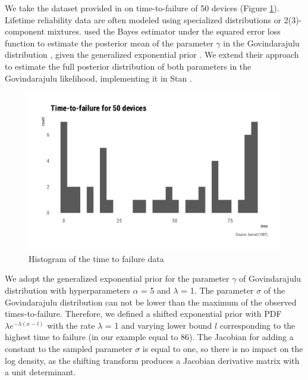 \documentclass[ba]{imsart}
\numberwithin{equation}{section}
\theoremstyle{plain}
\begin{document}
We take the dataset provided in \citet{aarset1987HowIdentifyBathtub} on time-to-failure of 50 devices (Figure \ref{fig:bathtub-hist}). Lifetime reliability data are often modeled using specialized distributions \citep{nadarajah2009BathtubshapedFailureRate} or 2(3)-component mixtures. \citet{nair2020BayesianInferenceQuantile} used the Bayes estimator under the squared error loss function to estimate the posterior mean of the parameter \(\gamma\) in the Govindarajulu distribution \citep{nair2012GovindarajuluDistributionProperties}, given the generalized exponential prior \citep{gupta2007GeneralizedExponentialDistribution}. We extend their approach to estimate the full posterior distribution of both parameters in the Govindarajulu likelihood, implementing it in Stan \citep{standevelopmentteam2021RStanInterfaceStan}.

\begin{figure}

{\centering \includegraphics[width=0.8\linewidth]{BA-submission_files/figure-latex/bathtub-hist-1} 

}

\caption{Histogram of the time to failure data}\label{fig:bathtub-hist}
\end{figure}

We adopt the generalized exponential prior for the parameter \(\gamma\) of Govindarajulu distribution with hyperparameters \(\alpha\) = 5 and \(\lambda\) = 1. The parameter \(\sigma\) of the Govindarajulu distribution can not be lower than the maximum of the observed times-to-failure. Therefore, we defined a shifted exponential prior with PDF \(\lambda e^{-\lambda(x-l)}\) with the rate \(\lambda\) = 1 and varying lower bound \(l\) corresponding to the highest time to failure (in our example equal to 86). The Jacobian for adding a constant to the sampled parameter \(\sigma\) is equal to one, so there is no impact on the log density, as the shifting transform produces a Jacobian derivative matrix with a unit determinant.
\end{document}
